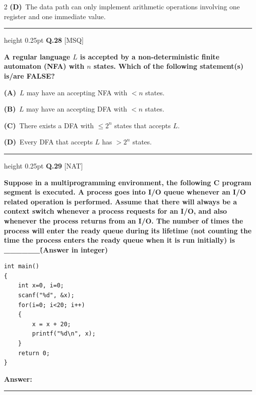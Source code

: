 \documentclass[a4paper,10pt,twoside]{article}
\begin{document}
\begin{multicols}{2}
\textbf{(D)}~The data path can only implement arithmetic operations involving one register and one immediate value.
\par\vspace{6pt}\hrule height 0.25pt\vspace{6pt}
\noindent\textbf{Q.28} \hfill {\footnotesize\textsf{[MSQ]}}
\par\vspace{2pt}
{\bfseries A regular language $L$ is accepted by a non-deterministic finite automaton (NFA) with $n$ states. Which of the following statement(s) is/are FALSE? \par}
\par\vspace{2pt}\noindent
\textbf{(A)}~$L$ may have an accepting NFA with $< n$ states.\par\vspace{2pt}\noindent
\textbf{(B)}~$L$ may have an accepting DFA with $< n$ states.\par\vspace{2pt}\noindent
\textbf{(C)}~There exists a DFA with $\le 2^n$ states that accepts $L$.\par\vspace{2pt}\noindent
\textbf{(D)}~Every DFA that accepts $L$ has $> 2^n$ states.
\par\vspace{6pt}\hrule height 0.25pt\vspace{6pt}
\noindent\textbf{Q.29} \hfill {\footnotesize\textsf{[NAT]}}
\par\vspace{2pt}
{\bfseries Suppose in a multiprogramming environment, the following C program segment is executed. A process goes into I/O queue whenever an I/O related operation is performed. Assume that there will always be a context switch whenever a process requests for an I/O, and also whenever the process returns from an I/O. The number of times the process will enter the ready queue during its lifetime (not counting the time the process enters the ready queue when it is run initially) is \_\_\_\_\_\_\. (Answer in integer)
\par\smallskip
\begin{verbatim}
int main()
{
    int x=0, i=0;
    scanf("%d", &x);
    for(i=0; i<20; i++)
    {
        x = x + 20;
        printf("%d\n", x);
    }
    return 0;
}
\end{verbatim} \par}
\par\vspace{3pt}\noindent\textbf{Answer:} \rule{3.2cm}{0.4pt}

\end{multicols}
\end{document}
